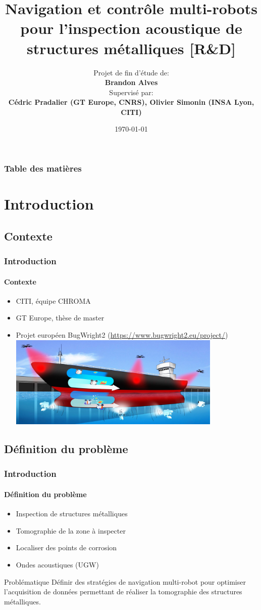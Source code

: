 \documentclass{beamer}
\title[Projet de Fin d'Étude]{Navigation et contrôle multi-robots pour l'inspection acoustique de structures métalliques [R\&D]}
\author[Brandon Alves]{
	Projet de fin d'étude de: \\
	\textbf{Brandon Alves} \\
	\vspace*{.25cm}
	\footnotesize Supervisé par: \\
	\textbf{Cédric Pradalier (GT Europe, CNRS), Olivier Simonin (INSA Lyon, CITI)}
}
\institute[INSA Lyon, CITI]{INSA Lyon, Laboratoire CITI, équipe CHROMA (INSA \& INRIA)}
\date{\today}
\begin{document}
	\begin{frame}
		\titlepage
	\end{frame}
	\begin{frame}[shrink=0]
		\frametitle{Table des matières}
		\tableofcontents
	\end{frame}
	\section{Introduction}
		\subsection*{Contexte}
			\begin{frame}
				\frametitle{Introduction}
				\framesubtitle{Contexte}
				\begin{itemize}
					\item CITI, équipe CHROMA
					\item GT Europe, thèse de master
					\item Projet européen BugWright2 (\url{https://www.bugwright2.eu/project/})
					\includegraphics[width=0.8\textwidth]{graphics/Concept-Cartoon-NJ3-e1582812224528.jpg}
				\end{itemize}
			\end{frame}
		\subsection*{Définition du problème}
			\begin{frame}
				\frametitle{Introduction}
				\framesubtitle{Définition du problème}
				\begin{itemize}
					\item Inspection de structures métalliques
					\item Tomographie de la zone à inspecter
					\item Localiser des points de corrosion
					\item Ondes acoustiques (UGW)
				\end{itemize}
				\begin{block}{Problématique}
					Définir des stratégies de navigation multi-robot pour optimiser l'acquisition de données permettant de réaliser la tomographie des structures métalliques.
				\end{block}
			\end{frame}
\end{document}
